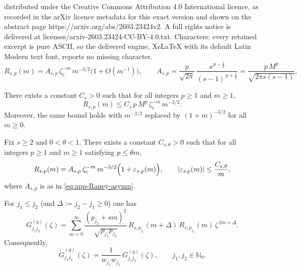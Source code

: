 \documentclass[10pt,a4paper]{amsart}
\newcommand{\NN}{\mathbb{N}}
\begin{document}
distributed under the Creative Commons Attribution 4.0 International licence, as recorded in the arXiv licence metadata for this exact version and shown on the abstract page https://arxiv.org/abs/2603.23424v2. A full rights notice is delivered at licenses/arxiv-2603.23424-CC-BY-4.0.txt. Characters: every retained excerpt is pure ASCII, so the delivered engine, XeLaTeX with its default Latin Modern text font, reports no missing character.
	\begin{equation}\label{eq:app-Raney-asymp}
		R_{s,p}(m)
		=
		A_{s,p}\,\zeta_c^{-m}\,m^{-3/2}\bigl(1+O(m^{-1})\bigr),
		\qquad
		A_{s,p}
		=
		\frac{p}{\sqrt{2\pi}}\,
		\frac{s^{\,p-\frac12}}{(s-1)^{\,p+\frac12}}
		=
		\frac{p\,M^{p}}{\sqrt{2\pi s(s-1)}}.
	\end{equation}

\begin{proposition}\label{prop:raney-uniform}
	There exists a constant $C_s>0$ such that for all integers $p\ge1$ and $m\ge1$,
	\begin{equation}\label{eq:raney-uniform}
		R_{s,p}(m)\le C_s\,p\,M^{p}\,\zeta_c^{-m}\,m^{-3/2}.
	\end{equation}
	Moreover, the same bound holds with $m^{-3/2}$ replaced by $(1+m)^{-3/2}$ for all $m\ge0$.
\end{proposition}

\begin{lemma}\label{lem:raney-uniform-expansion}
	Fix \(s\ge2\) and \(0<\theta<1\).  There exists a constant \(C_{s,\theta}>0\)
	such that for all integers \(p\ge1\) and \(m\ge1\) satisfying \(p\le \theta m\),
	\begin{equation}\label{eq:raney-uniform-expansion}
		R_{s,p}(m)
		=
		A_{s,p}\,\zeta_c^{-m}\,m^{-3/2}\Bigl(1+\varepsilon_{s,p}(m)\Bigr),
		\qquad
		|\varepsilon_{s,p}(m)|\le \frac{C_{s,\theta}}{m},
	\end{equation}
	where $A_{s,p}$ is as in \eqref{eq:app-Raney-asymp}.
\end{lemma}

\begin{lemma}\label{lem:Gram-entry}
	For $j_1\le j_2$ (and $\Delta:=j_2-j_1\ge0$) one has
	\begin{equation}\label{eq:app-Gram-entry}
		G^{(q)}_{j_1j_2}(\zeta)
		=
		\sum_{m=0}^{\infty}
		\frac{(p_{j_2}+sm)^{2}}{\sqrt{p_{j_1}p_{j_2}}}\,
		R_{s,p_{j_1}}(m+\Delta)\,R_{s,p_{j_2}}(m)\,\zeta^{\,2m+\Delta}.
	\end{equation}
	Consequently,
	\begin{equation}\label{eq:app-Gtilde-entry-clean}
		\widetilde G^{(q)}_{j_1j_2}(\zeta)
		=
		\frac{1}{w_{j_1}w_{j_2}}\,G^{(q)}_{j_1j_2}(\zeta),
		\qquad j_1,j_2\in\NN_0.
	\end{equation}
\end{lemma}
\end{document}
